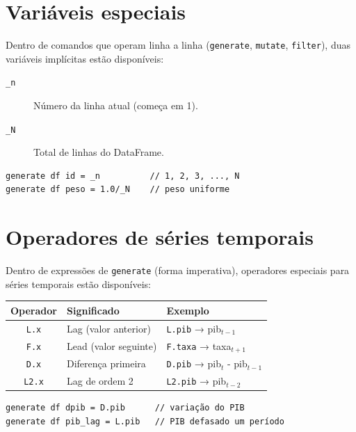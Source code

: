 \section{Variáveis especiais}

Dentro de comandos que operam linha a linha (\lstinline{generate}, \lstinline{mutate},
\lstinline{filter}), duas variáveis implícitas estão disponíveis:

\begin{description}
  \item[\lstinline{_n}] Número da linha atual (começa em 1).
  \item[\lstinline{_N}] Total de linhas do DataFrame.
\end{description}

\begin{lstlisting}
generate df id = _n          // 1, 2, 3, ..., N
generate df peso = 1.0/_N    // peso uniforme
\end{lstlisting}

\section{Operadores de séries temporais}

Dentro de expressões de \lstinline{generate} (forma imperativa), operadores especiais
para séries temporais estão disponíveis:

\begin{center}
\begin{tabular}{cll}
\toprule
\textbf{Operador} & \textbf{Significado} & \textbf{Exemplo} \\
\midrule
\texttt{L.x}   & Lag (valor anterior)     & \texttt{L.pib}  → pib$_{t-1}$ \\
\texttt{F.x}   & Lead (valor seguinte)    & \texttt{F.taxa} → taxa$_{t+1}$ \\
\texttt{D.x}   & Diferença primeira       & \texttt{D.pib}  → pib$_t$ - pib$_{t-1}$ \\
\texttt{L2.x}  & Lag de ordem 2           & \texttt{L2.pib} → pib$_{t-2}$ \\
\bottomrule
\end{tabular}
\end{center}

\begin{lstlisting}[caption={Operadores de séries temporais}]
generate df dpib = D.pib      // variação do PIB
generate df pib_lag = L.pib   // PIB defasado um período
\end{lstlisting}
